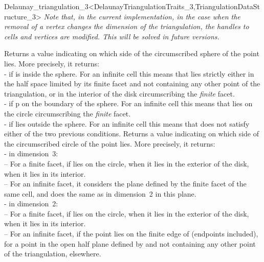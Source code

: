 \begin{ccRefClass}{Delaunay_triangulation_3<DelaunayTriangulationTraits_3,TriangulationDataStructure_3>}
\textit{Note that, in the current implementation, in the case when the
removal of a vertex changes the dimension of the triangulation, the
handles to cells and vertices are modified. This will be solved in
future versions.} 


{Returns a value indicating on which side of the circumscribed sphere
of  the point  lies. More precisely, it returns:\\
-  if  is inside the sphere. For an infinite
cell this means that  lies strictly either in the half space
limited by its finite facet and not containing any other point of the
triangulation, or in the interior of the disk circumscribing the
\textit{finite} facet. \\ 
-  if p on the boundary of the sphere. For an infinite
cell this means that  lies on the circle circumscribing
the \textit{finite} facet.\\ 
-  if  lies outside the sphere. For an
infinite cell this means that  does not satisfy either of the
two previous conditions. 
}
{Returns a value indicating on which side of the circumscribed circle
of  the point  lies. More precisely, it returns:\\
- in dimension~3:\\
-- For a finite facet,  if  lies
on the circle,  when it lies in the exterior of
the disk,  when it lies in its interior.\\
-- For an infinite facet, it considers the plane defined by the finite
facet of the same cell, and does the same as in dimension~2 in this
plane.\\
- in dimension~2:\\
-- For a finite facet,  if  lies
on the circle,  when it lies in the exterior of
the disk,  when it lies in its interior.\\
-- For an infinite facet,  if the
point lies on the finite edge of  (endpoints included),
 for a point in the open half plane defined
by  and not containing any other point of the triangulation,
 elsewhere. 
}


\end{ccRefClass}
